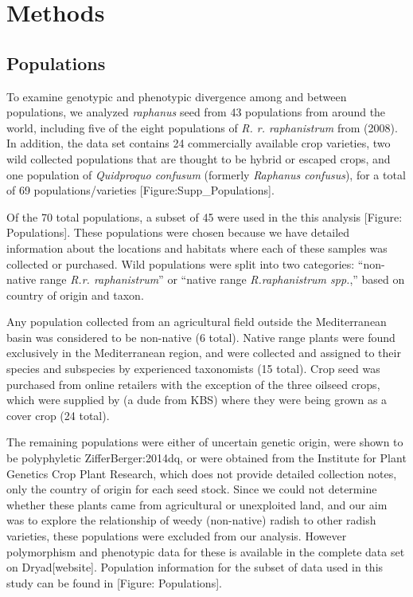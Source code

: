 \documentclass[twocolumn]{bmcart}%
\begin{document}
\section*{Methods}
\subsection*{Populations}
To examine genotypic and phenotypic divergence among and between populations, we analyzed \textit{raphanus} seed from 43 populations from around the world, including five of the eight populations of \textit{R. r. raphanistrum} from (2008). In addition, the data set contains 24 commercially available crop varieties, two wild collected populations that are thought to be hybrid or escaped crops, and one population of \textit{Quidproquo confusum} (formerly \textit{Raphanus confusus}), for a total of 69 populations/varieties [Figure:Supp\_Populations].

Of the 70 total populations, a subset of 45 were used in the this analysis [Figure: Populations]. These populations were chosen because we have detailed information about the locations and habitats where each of these samples was collected or purchased. Wild populations were split into two categories: “non-native range \textit{R.r. raphanistrum}” or “native range \textit{R.raphanistrum spp.},” based on country of origin and taxon.

Any population collected from an agricultural field outside the Mediterranean basin was considered to be non-native (6 total). Native range plants were found exclusively in the Mediterranean region, and were collected and assigned to their species and subspecies by experienced taxonomists (15 total). Crop seed was purchased from online retailers with the exception of the three oilseed crops, which were supplied by (a dude from KBS) where they were being grown as a cover crop (24 total).

The remaining populations were either of uncertain genetic origin, were shown to be polyphyletic {ZifferBerger:2014dq}, or were obtained from the Institute for Plant Genetics Crop Plant Research, which does not provide detailed collection notes, only the country of origin for each seed stock. Since we could not determine whether these plants came from agricultural or unexploited land, and our aim was to explore the relationship of weedy (non-native) radish to other radish varieties, these populations were excluded from our analysis. However polymorphism and phenotypic data for these is available in the complete data set on Dryad[website]. Population information for the subset of data used in this study can be found in [Figure: Populations].
\end{document}
